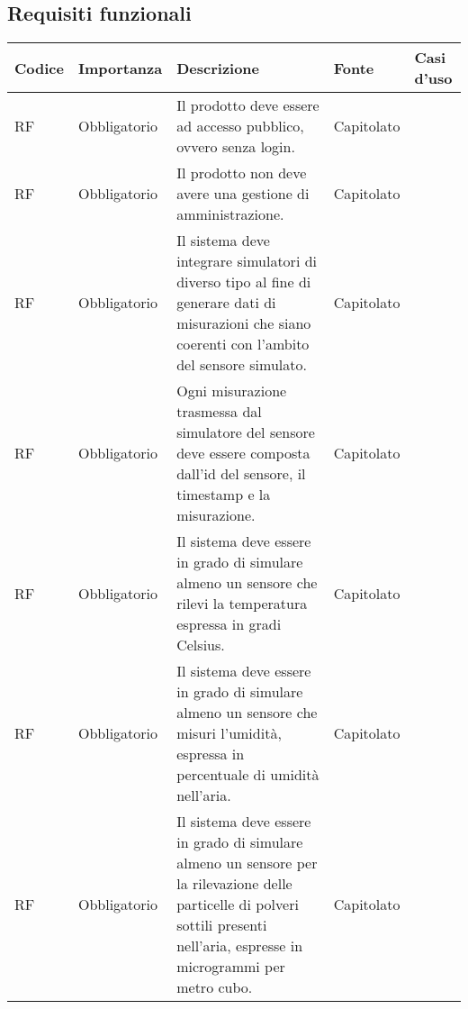 \subsection{Requisiti funzionali}

\begin{longtable}{|C{1.5cm}|C{2cm}|L{5cm}|C{2cm}|C{1.5cm}|}
    \hline
    \textbf{Codice} & \textbf{Importanza} & \textbf{Descrizione} & \textbf{Fonte}  & \textbf{Casi d'uso} \\
    
    \hline
    RF & Obbligatorio & Il prodotto deve essere ad accesso pubblico, ovvero senza login. & Capitolato & \\
    
    \hline
     RF & Obbligatorio & Il prodotto non deve avere una gestione di amministrazione. & Capitolato & \\
    
    \hline
     RF & Obbligatorio & Il sistema deve integrare simulatori di diverso tipo al fine di generare dati di misurazioni che siano coerenti con l'ambito del sensore simulato. & Capitolato & \\
    
    \hline
     RF & Obbligatorio & Ogni misurazione trasmessa dal simulatore del sensore deve essere composta dall'id del sensore, il timestamp e la misurazione. & Capitolato & \\
    
    \hline
     RF & Obbligatorio &  Il sistema deve essere in grado di simulare almeno un sensore che rilevi la temperatura espressa in gradi Celsius. & Capitolato &  \\
    
    \hline
     RF & Obbligatorio &  Il sistema deve essere in grado di simulare almeno un sensore che misuri l'umidità, espressa in percentuale di umidità nell'aria. & Capitolato &  \\
    
    \hline
     RF & Obbligatorio &  Il sistema deve essere in grado di simulare almeno un sensore per la rilevazione delle particelle di polveri sottili presenti nell'aria, espresse in microgrammi per metro cubo. & Capitolato & \\
    

\end{longtable}
